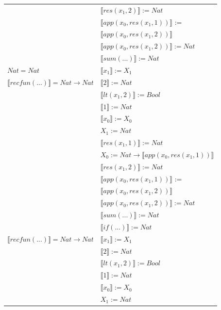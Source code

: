 \begin{exercise}
\begin{description}
\begin{center}
\begin{longtable}[!h]{ | l | l | }
			     & $ \llbracket res(x_1,2) \rrbracket := Nat$ \\
			     & $ \llbracket app(x_0, res(x_1,1)) \rrbracket$ := \\
			     & $ \llbracket app(x_0, res(x_1,2)) \rrbracket$\\ 
			     & $ \llbracket app(x_0, res(x_1,2)) \rrbracket := Nat$ \\
			     & $ \llbracket sum(...) \rrbracket := Nat$ \\
                     \hline 
                        $ Nat = Nat$ & $ \llbracket x_1 \rrbracket := X_1$\\
                        $ \llbracket recfun(...) \rrbracket =   Nat  \to  Nat $ & $ \llbracket 2 \rrbracket := Nat$\\ 
                        & $ \llbracket lt(x_1 , 2) \rrbracket := Bool$\\ 
                        & $ \llbracket 1 \rrbracket := Nat$\\  
			     & $ \llbracket x_0 \rrbracket := X_0$\\
			     & $X_1 := Nat$\\
			     & $ \llbracket res(x_1,1) \rrbracket := Nat$\\
			     & $X_0 := Nat \to  \llbracket app(x_0, res(x_1,1)) \rrbracket$ \\
			     & $ \llbracket res(x_1,2) \rrbracket := Nat$ \\
			     & $ \llbracket app(x_0, res(x_1,1)) \rrbracket$ := \\
			     & $ \llbracket app(x_0, res(x_1,2)) \rrbracket$\\ 
			     & $ \llbracket app(x_0, res(x_1,2)) \rrbracket := Nat$ \\
			     & $ \llbracket sum(...) \rrbracket := Nat$ \\
			     & $ \llbracket if(...) \rrbracket := Nat$  \\
                     \hline 
                        $ \llbracket recfun(...) \rrbracket =   Nat  \to Nat $ & $ \llbracket x_1 \rrbracket := X_1$\\
                        & $ \llbracket 2 \rrbracket := Nat$\\ 
                        & $ \llbracket lt(x_1 , 2) \rrbracket := Bool$\\  
			     & $ \llbracket 1 \rrbracket := Nat$\\
			     & $ \llbracket x_0 \rrbracket := X_0$\\
			     & $X_1 := Nat$\\

\end{longtable}
\end{center}
\end{description}
\end{exercise}
